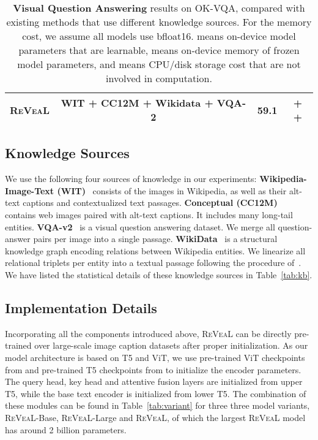 \documentclass[10pt,twocolumn,letterpaper]{article}
\newcommand{\method}{R\textsc{e}V\textsc{ea}L\xspace}
\begin{document}
\begin{table*}[t!]
\begin{tabular}{l|c|c|c}
\method   &  WIT + CC12M + Wikidata + VQA-2            & \textbf{59.1} & \color{green}{4.2} + \color{blue}{10} + \color{red}{993}  \\
\bottomrule
\end{tabular}
    \vspace{-.1in}
\caption{\textbf{Visual Question Answering} results on OK-VQA, compared with existing methods that use different knowledge sources. For the memory cost, we assume all models use bfloat16. {\color{green}{Green}} means on-device model parameters that are learnable, {\color{blue}{Blue}} means on-device memory of frozen model parameters, and {\color{red}{Red}} means CPU/disk storage cost that are not involved in computation.}
\label{tab:okvqa}
\end{table*}

\subsection{Knowledge Sources} \label{sec:knowledge-sources}
We use the following four sources of knowledge in our experiments: 
\textbf{Wikipedia-Image-Text (WIT)}~\cite{DBLP:conf/sigir/Srinivasan0CBN21} consists of the images in Wikipedia, as well as their alt-text captions and contextualized text passages.
\textbf{Conceptual (CC12M)}~\cite{changpinyo2021cc12m} contains web images paired with alt-text captions. It includes many long-tail entities.
\textbf{VQA-v2}~\cite{DBLP:journals/ijcv/GoyalKASBP19} is a visual question answering dataset. We merge all question-answer pairs per image into a single passage.
\textbf{WikiData}~\cite{DBLP:journals/cacm/VrandecicK14} is a structural knowledge graph encoding relations between Wikipedia entities. We linearize all relational triplets per entity into a textual passage following the procedure of~\cite{DBLP:journals/corr/abs-2012-14610}.
We have listed the statistical details of these knowledge sources in Table~\ref{tab:kb}. 








\subsection{Implementation Details} \label{sec:impl}
Incorporating all the components introduced above, \method can be directly pre-trained over large-scale image caption datasets after proper initialization. As our model architecture is based on T5 and ViT, we use pre-trained ViT checkpoints from \cite{DBLP:conf/cvpr/Zhai0HB22} and pre-trained T5 checkpoints from \cite{DBLP:journals/jmlr/RaffelSRLNMZLL20} to initialize the encoder parameters. 
The query head, key head and attentive fusion layers are initialized from upper T5, while the base text encoder is initialized from lower T5.
The combination of these modules can be found in Table~\ref{tab:variant} for three three model variants, \method-Base, \method-Large and \method, of which the largest \method model has around 2 billion parameters. 
\end{document}
